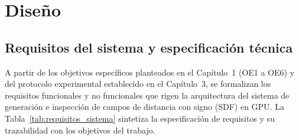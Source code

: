 \clearpage
\section{Diseño}

\subsection{Requisitos del sistema y especificación técnica}

A partir de los objetivos específicos planteados en el Capítulo~1 (OE1 a OE6) y del protocolo experimental establecido en el Capítulo~3, se formalizan los requisitos funcionales y no funcionales que rigen la arquitectura del sistema de generación e inspección de campos de distancia con signo (SDF) en GPU. La Tabla~\ref{tab:requisitos_sistema} sintetiza la especificación de requisitos y su trazabilidad con los objetivos del trabajo.

